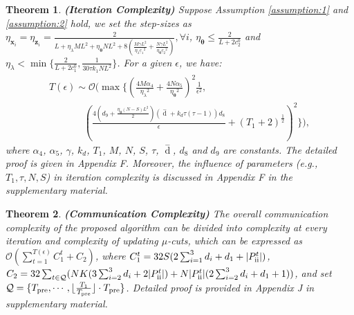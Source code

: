 \documentclass[letterpaper]{article}
\newtheorem{theorem}{Theorem}
\begin{document}
\begin{theorem}
\label{theorem 2}
{\textbf{(Iteration Complexity)}} Suppose Assumption \ref{assumption:1} and \ref{assumption:2} hold, we set the step-sizes as
${\eta _{\boldsymbol{x}_i}}\!=\! {\eta _{\boldsymbol{z}_i}} \! =\! \frac{2}{{L + {{\eta _{\lambda}}}M{L^2} + {{\eta _{\boldsymbol{\theta }}}}N{L^2} + 8(\frac{{M\gamma {L^2}}}{{{{\eta _{\lambda}}}{\underline{c}_1}^2}} + \frac{{N\gamma {L^2}}}{{{{\eta _{\boldsymbol{\theta }}}}{\underline{c}_2}^2}})}},\forall i$, $ {\eta _{\boldsymbol{\theta }}} \le \frac{2}{{L + 2c_2^0}} $ and   ${{\eta _{\lambda}}} \!<\! \min \{\frac{ 2}{{L + 2c_1^0}}  ,\frac{1}{{30\tau{k_1}N{L^2}}}\} $. For a given $\epsilon $, we have:
\begin{equation}
\begin{array}{l}
\!T( \epsilon ) \! \sim  \! \mathcal{O}(\max  \{ {(\frac{{4M\alpha_4}}{{{{\eta _{\lambda}}}^2}}\! +\! \frac{{4N\alpha_5}}{{{{\eta _{\boldsymbol{\theta }}}}^2}})^2}\frac{1}{{{\epsilon ^2}}}, \\

\qquad \quad \; \;  {(\frac{{4{{{(d_9 + \frac{{{{\eta _{\boldsymbol{\theta }}}}(N  \!-\!  S){{L}^2}}}{2})}}} (\mathop d\limits^ -  +  k_d\tau(\tau  -  1))  {d_8}}}{{{\epsilon}}} \!+\! (T_1 \!+\! 2)^{\frac{1}{2}})^2}\}),
\end{array}
\end{equation}
where ${\alpha_4}$, ${\alpha_5}$, $\gamma$,  $k_d$, $T_1$, $M$, $N$, $S$, $\tau$, $\mathop d\limits^ -  $, ${d_8}$ and ${d_9}$ are constants. The detailed proof is given in Appendix F.  Moreover, the influence of parameters (e.g., $T_1, \tau, N, S$) in iteration complexity is discussed in Appendix F in the supplementary material.
\end{theorem}

\begin{theorem}
\label{theorem: communication complexity}
{\textbf{(Communication Complexity)}} The overall communication complexity of the proposed algorithm can be divided into complexity at every iteration and complexity of updating $\mu$-cuts, which can be expressed as $\mathcal{O}( \sum_{t=1}^{T( \epsilon )}{C_1^t} + C_2)$, where $C_1^t=32S(2\sum_{i=1}^3{d_i}+d_1 +|P_{{\rm{\uppercase\expandafter{\romannumeral2}}}}^{t}| )$, $C_2=32\sum_{t\in \mathcal{Q}} (NK(3\sum_{i=2}^3d_i+2|P_{{\rm{\uppercase\expandafter{\romannumeral2}}}}^{t}|) + N|P_{{\rm{\uppercase\expandafter{\romannumeral2}}}}^{t}|(2\sum_{i=2}^3d_i+d_1+1)  ) $, and set $\mathcal{Q}=\{ T_{{\rm{pre}}}, \cdots, \lfloor \frac{T_1}{T_{{\rm{pre}}}} \rfloor \cdot T_{{\rm{pre}}} \}$. Detailed proof is provided in Appendix J in supplementary material.

\end{theorem}
\end{document}
